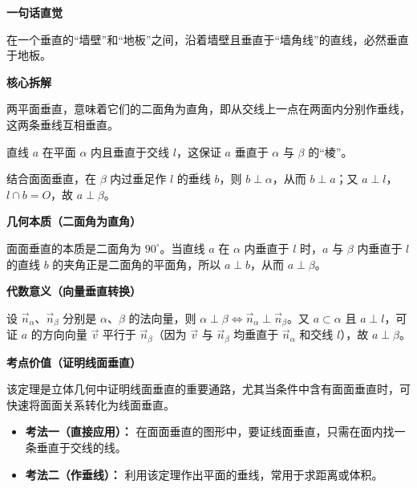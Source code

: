 \begin{explanationbox}
	\textbf{\textcolor{CExplanation}{一句话直觉}}

	在一个垂直的“墙壁”和“地板”之间，沿着墙壁且垂直于“墙角线”的直线，必然垂直于地板。

	\medskip
	\textbf{\textcolor{CExplanation}{核心拆解}}
	\begin{description}[style=nextline, leftmargin=2.8em, labelsep=0.5em, itemsep=0.45em]
		\item[\textbf{要点一（面面垂直条件）：}] 两平面垂直，意味着它们的二面角为直角，即从交线上一点在两面内分别作垂线，这两条垂线互相垂直。
		\item[\textbf{要点二（线面条件）：}] 直线 $a$ 在平面 $\alpha$ 内且垂直于交线 $l$，这保证 $a$ 垂直于 $\alpha$ 与 $\beta$ 的“棱”。
		\item[\textbf{要点三（传递垂直原理）：}] 结合面面垂直，在 $\beta$ 内过垂足作 $l$ 的垂线 $b$，则 $b\perp\alpha$，从而 $b\perp a$；又 $a\perp l$，$l\cap b=O$，故 $a\perp\beta$。
	\end{description}

	\medskip
	\textbf{\textcolor{CExplanation}{几何本质（二面角为直角）}}

	面面垂直的本质是二面角为 $90^\circ$。当直线 $a$ 在 $\alpha$ 内垂直于 $l$ 时，$a$ 与 $\beta$ 内垂直于 $l$ 的直线 $b$ 的夹角正是二面角的平面角，所以 $a\perp b$，从而 $a\perp\beta$。

	\medskip
	\textbf{\textcolor{CExplanation}{代数意义（向量垂直转换）}}

	设 $\vec{n}_{\alpha}$、$\vec{n}_{\beta}$ 分别是 $\alpha$、$\beta$ 的法向量，则 $\alpha\perp\beta\iff\vec{n}_{\alpha}\perp\vec{n}_{\beta}$。又 $a\subset\alpha$ 且 $a\perp l$，可证 $a$ 的方向向量 $\vec{v}$ 平行于 $\vec{n}_{\beta}$（因为 $\vec{v}$ 与 $\vec{n}_{\beta}$ 均垂直于 $\vec{n}_{\alpha}$ 和交线 $l$），故 $a\perp\beta$。

	\medskip
	\textbf{\textcolor{CExplanation}{考点价值（证明线面垂直）}}

	该定理是立体几何中证明线面垂直的重要通路，尤其当条件中含有面面垂直时，可快速将面面关系转化为线面垂直。

	\begin{itemize}[leftmargin=*, itemsep=0.5em, topsep=0.4em]
		\item \textbf{考法一（直接应用）：} 在面面垂直的图形中，要证线面垂直，只需在面内找一条垂直于交线的线。
		\item \textbf{考法二（作垂线）：} 利用该定理作出平面的垂线，常用于求距离或体积。
	\end{itemize}


\end{explanationbox}
